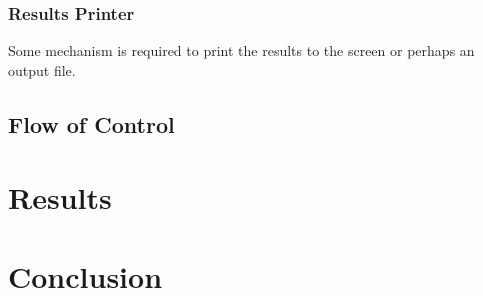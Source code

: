 \documentclass[12pt,a4paper]{article}
\begin{document}
\subsubsection{Results Printer}

Some mechanism is required to print the results to the screen or perhaps an output file.

\subsection{Flow of Control}

\section{Results}

\section{Conclusion}

\newpage
\singlespacing
{}


\end{document}
